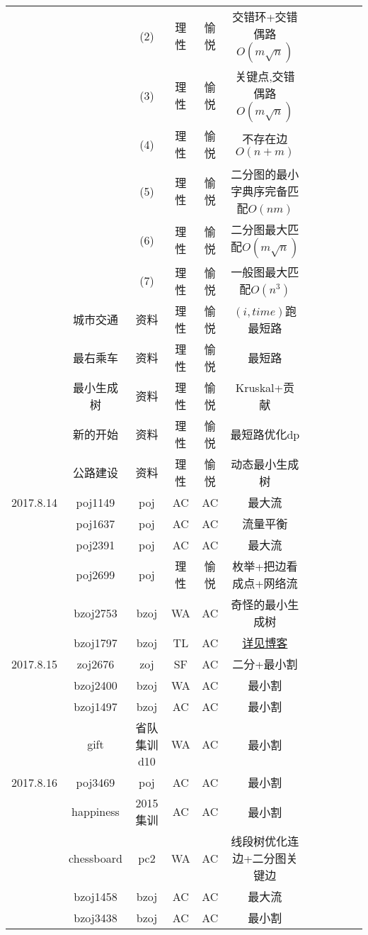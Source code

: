 \documentclass[landscape]{article}
\begin{document}
\begin{longtable}{ccccccccccc}
  & & (2) & 理性 & 愉悦 & 交错环+交错偶路$O(m\sqrt{n})$\\

  & & (3) & 理性 & 愉悦 & 关键点,交错偶路$O(m\sqrt{n})$\\

  & & (4) & 理性 & 愉悦 & 不存在边$O(n+m)$\\

  & & (5) & 理性 & 愉悦 & 二分图的最小字典序完备匹配$O(nm)$\\

  & & (6) & 理性 & 愉悦 & 二分图最大匹配$O(m\sqrt{n})$\\

  & & (7) & 理性 & 愉悦 & 一般图最大匹配$O(n^3)$\\
   & 城市交通 & 资料 & 理性 & 愉悦 & $(i,time)$跑最短路\\
   & 最右乘车 & 资料 & 理性 & 愉悦 & 最短路\\
   & 最小生成树 & 资料 & 理性 & 愉悦 & Kruskal+贡献\\
   & 新的开始 & 资料 & 理性 & 愉悦 & 最短路优化dp\\
   & 公路建设 & 资料 & 理性 & 愉悦 & 动态最小生成树\\
  \hline
  2017.8.14 & poj1149 & poj & AC & AC & 最大流\\
   & poj1637 & poj & AC & AC & 流量平衡\\
   & poj2391 & poj & AC & AC & 最大流\\
   & poj2699 & poj & 理性 & 愉悦 & 枚举+把边看成点+网络流\\
   & bzoj2753 & bzoj & WA & AC & 奇怪的最小生成树\\
   & bzoj1797 & bzoj & TL & AC & \href{http://blog.csdn.net/xy20130630/article/details/77162229}{详见博客}\\
  \hline
  2017.8.15 & zoj2676 & zoj & SF & AC & 二分+最小割\\
   & bzoj2400 & bzoj & WA & AC & 最小割\\
   & bzoj1497 & bzoj & AC & AC & 最小割\\
   & gift & 省队集训d10 & WA & AC & 最小割\\
  \hline
  2017.8.16 & poj3469 & poj & AC & AC & 最小割\\
   & happiness & 2015集训 & AC & AC & 最小割\\
   & chessboard & pc2 & WA & AC & 线段树优化连边+二分图关键边\\
   & bzoj1458 & bzoj & AC & AC & 最大流\\
   & bzoj3438 & bzoj & AC & AC & 最小割\\

\end{longtable}
\end{document}
